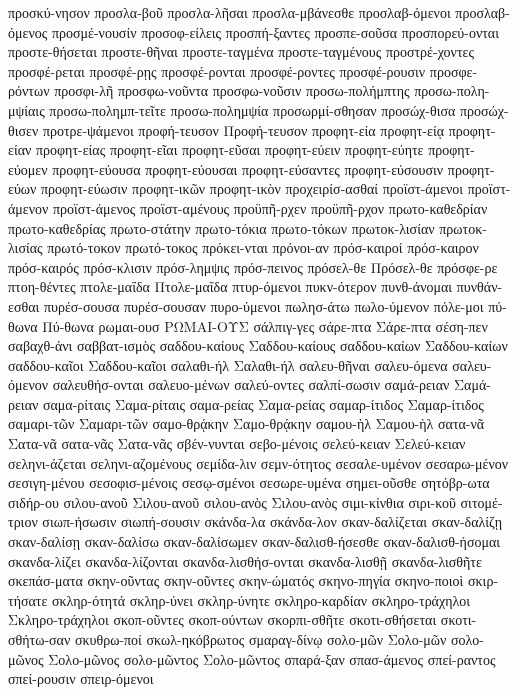 {προσκύ-νησον
προσλα-βοῦ
προσλα-λῆσαι
προσλα-μβάνεσθε
προσλαβ-όμενοι
προσλαβ-όμενος
προσμέ-νουσίν
προσοφ-είλεις
προσπή-ξαντες
προσπε-σοῦσα
προσπορεύ-ονται
προστε-θήσεται
προστε-θῆναι
προστε-ταγμένα
προστε-ταγμένους
προστρέ-χοντες
προσφέ-ρεται
προσφέ-ρῃς
προσφέ-ρονται
προσφέ-ροντες
προσφέ-ρουσιν
προσφε-ρόντων
προσφι-λῆ
προσφω-νοῦντα
προσφω-νοῦσιν
προσω-πολήμπτης
προσω-πολη-μψίαις
προσω-πολημπ-τεῖτε
προσω-πολημψία
προσωρμί-σθησαν
προσώχ-θισα
προσώχ-θισεν
προτρε-ψάμενοι
προφή-τευσον
Προφή-τευσον
προφητ-εία
προφητ-είᾳ
προφητ-είαν
προφητ-είας
προφητ-εῖαι
προφητ-εῦσαι
προφητ-εύειν
προφητ-εύητε
προφητ-εύομεν
προφητ-εύουσα
προφητ-εύουσαι
προφητ-εύσαντες
προφητ-εύσουσιν
προφητ-εύων
προφητ-εύωσιν
προφητ-ικῶν
προφητ-ικὸν
προχειρίσ-ασθαί
προϊστ-άμενοι
προϊστ-άμενον
προϊστ-άμενος
προϊστ-αμένους
προϋπῆ-ρχεν
προϋπῆ-ρχον
πρωτο-καθεδρίαν
πρωτο-καθεδρίας
πρωτο-στάτην
πρωτο-τόκια
πρωτο-τόκων
πρωτοκ-λισίαν
πρωτοκ-λισίας
πρωτό-τοκον
πρωτό-τοκος
πρόκει-νται
πρόνοι-αν
πρόσ-καιροί
πρόσ-καιρον
πρόσ-καιρός
πρόσ-κλισιν
πρόσ-λημψις
πρόσ-πεινος
πρόσελ-θε
Πρόσελ-θε
πρόσφε-ρε
πτοη-θέντες
πτολε-μαΐδα
Πτολε-μαΐδα
πτυρ-όμενοι
πυκν-ότερον
πυνθ-άνομαι
πυνθάν-εσθαι
πυρέσ-σουσα
πυρέσ-σουσαν
πυρο-ύμενοι
πωλησ-άτω
πωλο-ύμενον
πόλε-μοι
πύ-θωνα
Πύ-θωνα
ρωμαι-ουσ
ΡΩΜΑΙ-ΟΥΣ
σάλπιγ-γες
σάρε-πτα
Σάρε-πτα
σέση-πεν
σαβαχθ-άνι
σαββατ-ισμὸς
σαδδου-καίους
Σαδδου-καίους
σαδδου-καίων
Σαδδου-καίων
σαδδου-καῖοι
Σαδδου-καῖοι
σαλαθι-ήλ
Σαλαθι-ήλ
σαλευ-θῆναι
σαλευ-όμενα
σαλευ-όμενον
σαλευθήσ-ονται
σαλευο-μένων
σαλεύ-οντες
σαλπί-σωσιν
σαμά-ρειαν
Σαμά-ρειαν
σαμα-ρίταις
Σαμα-ρίταις
σαμα-ρείας
Σαμα-ρείας
σαμαρ-ίτιδος
Σαμαρ-ίτιδος
σαμαρι-τῶν
Σαμαρι-τῶν
σαμο-θρᾴκην
Σαμο-θρᾴκην
σαμου-ὴλ
Σαμου-ὴλ
σατα-νᾶ
Σατα-νᾶ
σατα-νᾶς
Σατα-νᾶς
σβέν-νυνται
σεβο-μένοις
σελεύ-κειαν
Σελεύ-κειαν
σεληνι-άζεται
σεληνι-αζομένους
σεμίδα-λιν
σεμν-ότητος
σεσαλε-υμένον
σεσαρω-μένον
σεσιγη-μένου
σεσοφισ-μένοις
σεσῳ-σμένοι
σεσωρε-υμένα
σημει-οῦσθε
σητόβρ-ωτα
σιδήρ-ου
σιλου-ανοῦ
Σιλου-ανοῦ
σιλου-ανὸς
Σιλου-ανὸς
σιμι-κίνθια
σιρι-κοῦ
σιτομέ-τριον
σιωπ-ήσωσιν
σιωπή-σουσιν
σκάνδα-λα
σκάνδα-λον
σκαν-δαλίζεται
σκαν-δαλίζῃ
σκαν-δαλίσῃ
σκαν-δαλίσω
σκαν-δαλίσωμεν
σκαν-δαλισθ-ήσεσθε
σκαν-δαλισθ-ήσομαι
σκανδα-λίζει
σκανδα-λίζονται
σκανδα-λισθήσ-ονται
σκανδα-λισθῇ
σκανδα-λισθῆτε
σκεπάσ-ματα
σκην-οῦντας
σκην-οῦντες
σκην-ώματός
σκηνο-πηγία
σκηνο-ποιοὶ
σκιρ-τήσατε
σκληρ-ότητά
σκληρ-ύνει
σκληρ-ύνητε
σκληρο-καρδίαν
σκληρο-τράχηλοι
Σκληρο-τράχηλοι
σκοπ-οῦντες
σκοπ-ούντων
σκορπι-σθῆτε
σκοτι-σθήσεται
σκοτι-σθήτω-σαν
σκυθρω-ποί
σκωλ-ηκόβρωτος
σμαραγ-δίνῳ
σολο-μῶν
Σολο-μῶν
σολο-μῶνος
Σολο-μῶνος
σολο-μῶντος
Σολο-μῶντος
σπαρά-ξαν
σπασ-άμενος
σπεί-ραντος
σπεί-ρουσιν
σπειρ-όμενοι
}
